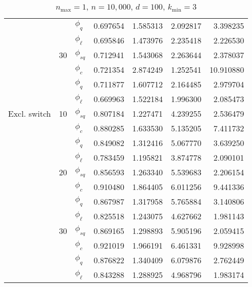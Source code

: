 \begin{table}[]
\begin{tabular}{l@{\hskip 12pt}l@{\hskip 12pt}l@{\hskip 12pt}r@{\hskip 12pt}r@{\hskip 12pt}r@{\hskip 12pt}r}
            &    &$\phi_{q}$ &  0.697654 &  1.585313 &    2.092817 &   3.398235 \\
            &    & $\phi_{\ell}$ &  0.695846 &  1.473976 &    2.235418 &   2.226530 \\\cmidrule{2-7}
            & 30 &$\phi_{sq}$ &  0.712941 &  1.543068 &    2.263644 &   2.378037 \\
            &    &$\phi_{c}$ &  0.721354 &  2.874249 &    1.252541 &  10.910880 \\
            &    &$\phi_{q}$ &  0.711877 &  1.607712 &    2.164485 &   2.979704 \\
            &    & $\phi_{\ell}$ &  0.669963 &  1.522184 &    1.996300 &   2.085473 \\\midrule
Excl. switch & 10 &$\phi_{sq}$ &  0.807184 &  1.227471 &    4.239255 &   2.536479 \\
            &    &$\phi_{c}$ &  0.880285 &  1.633530 &    5.135205 &   7.411732 \\
            &    &$\phi_{q}$ &  0.849082 &  1.312416 &    5.067770 &   3.639250 \\
            &    & $\phi_{\ell}$ &  0.783459 &  1.195821 &    3.874778 &   2.090101 \\\cmidrule{2-7}
            & 20 &$\phi_{sq}$ &  0.856593 &  1.263340 &    5.539683 &   2.206154 \\
            &    &$\phi_{c}$ &  0.910480 &  1.864405 &    6.011256 &   9.441336 \\
            &    &$\phi_{q}$ &  0.867987 &  1.317958 &    5.765884 &   3.140806 \\
            &    & $\phi_{\ell}$ &  0.825518 &  1.243075 &    4.627662 &   1.981143 \\\cmidrule{2-7}
            & 30 &$\phi_{sq}$ &  0.869165 &  1.298893 &    5.905196 &   2.059415 \\
            &    &$\phi_{c}$ &  0.921019 &  1.966191 &    6.461331 &   9.928998 \\
            &    &$\phi_{q}$ &  0.876822 &  1.340409 &    6.079876 &   2.762449 \\
            &    & $\phi_{\ell}$ &  0.843288 &  1.288925 &    4.968796 &   1.983174 \\
\bottomrule
\end{tabular}
    \caption{$n_{\max}=1$, $n=10,\!000$, $d=100$, $k_{\min}=3$}
    \label{tab:eff1}
\end{table}

